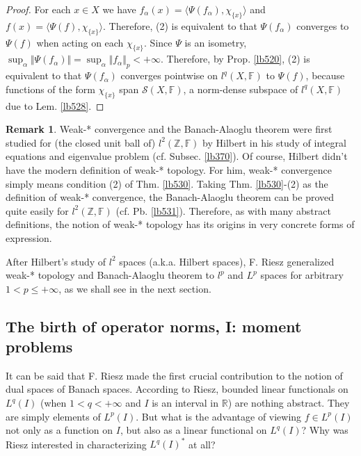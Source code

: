 \documentclass[12pt,b5paper,notitlepage]{article}
\theoremstyle{definition}
\newtheorem{rem}[df]{Remark}
\theoremstyle{plain}
\newcommand{\mc}{\mathcal}
\newcommand{\bk}[1]{\langle {#1}\rangle}
\newcommand{\Zbb}{\mathbb Z}
\newcommand{\Rbb}{\mathbb R}
\newcommand{\Fbb}{\mathbb F}
\numberwithin{equation}{section}
\begin{document}
\begin{proof}
For each $x\in X$ we have $f_\alpha(x)=\bk{\Psi(f_\alpha),\chi_{\{x\}}}$ and $f(x)=\bk{\Psi(f),\chi_{\{x\}}}$. Therefore, (2) is equivalent to that $\Psi(f_\alpha)$ converges to $\Psi(f)$ when acting on each $\chi_{\{x\}}$.  Since $\Psi$ is an isometry, $\sup_\alpha \Vert\Psi(f_\alpha)\Vert=\sup_\alpha\Vert f_\alpha\Vert_p<+\infty$. Therefore, by Prop. \ref{lb520}, (2) is equivalent to that $\Psi(f_\alpha)$ converges pointwise on $l^q(X,\Fbb)$ to $\Psi(f)$, because functions of the form $\chi_{\{x\}}$ span $\mc S(X,\Fbb)$, a norm-dense subspace of $l^q(X,\Fbb)$ due to Lem. \ref{lb528}.
\end{proof}


\begin{rem}
Weak-* convergence and the Banach-Alaoglu theorem were first studied for (the closed unit ball of) $l^2(\Zbb,\Fbb)$ by Hilbert in his study of integral equations and eigenvalue problem (cf. Subsec. \ref{lb370}). Of course, Hilbert didn't have the modern definition of weak-* topology. For him, weak-* convergence simply means condition (2) of Thm. \ref{lb530}. Taking Thm. \ref{lb530}-(2) as the definition of weak-* convergence, the Banach-Alaoglu theorem can be proved quite easily for $l^2(\Zbb,\Fbb)$ (cf. Pb. \ref{lb531}). Therefore, as with many abstract definitions, the notion of weak-* topology has its origins in very concrete forms of expression. 
\end{rem}

After Hilbert's study of $l^2$ spaces (a.k.a. Hilbert spaces), F. Riesz generalized weak-* topology and Banach-Alaoglu theorem to $l^p$ and $L^p$ spaces for arbitrary $1<p\leq+\infty$, as we shall see in the next section.







\subsection{The birth of operator norms, I: moment problems}\label{lb543}

It can be said that F. Riesz made the first crucial contribution to the notion of dual spaces of Banach spaces. According to Riesz, bounded linear functionals on $L^q(I)$ (when $1<q<+\infty$ and $I$ is an interval in $\Rbb$) are nothing abstract. They are simply elements of $L^p(I)$. But what is the advantage of viewing $f\in L^p(I)$ not only as a function on $I$, but also as a linear functional on $L^q(I)$? Why was Riesz interested in characterizing $L^q(I)^*$ at all?
\end{document}
